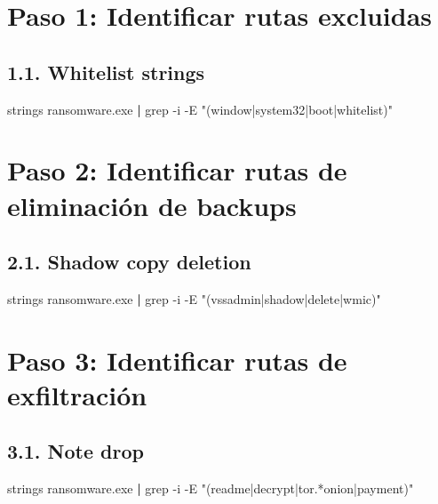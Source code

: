 \documentclass[
  letterpaper,
]{report}
\newenvironment{Shaded}{\begin{snugshade}}{\end{snugshade}}
\newcommand{\AttributeTok}[1]{\textcolor[rgb]{0.40,0.45,0.13}{#1}}
\newcommand{\FunctionTok}[1]{\textcolor[rgb]{0.28,0.35,0.67}{#1}}
\newcommand{\KeywordTok}[1]{\textcolor[rgb]{0.00,0.23,0.31}{\textbf{#1}}}
\newcommand{\NormalTok}[1]{\textcolor[rgb]{0.00,0.23,0.31}{#1}}
\newcommand{\StringTok}[1]{\textcolor[rgb]{0.13,0.47,0.30}{#1}}
\begin{document}
\section{Paso 1: Identificar rutas
excluidas}\label{paso-1-identificar-rutas-excluidas}

\subsection{1.1. Whitelist strings}\label{whitelist-strings}

\begin{Shaded}
\begin{Highlighting}[]
\FunctionTok{strings}\NormalTok{ ransomware.exe }\KeywordTok{|} \FunctionTok{grep} \AttributeTok{{-}i} \AttributeTok{{-}E} \StringTok{"(window|system32|boot|whitelist)"}
\end{Highlighting}
\end{Shaded}

\section{Paso 2: Identificar rutas de eliminación de
backups}\label{paso-2-identificar-rutas-de-eliminaciuxf3n-de-backups}

\subsection{2.1. Shadow copy deletion}\label{shadow-copy-deletion}

\begin{Shaded}
\begin{Highlighting}[]
\FunctionTok{strings}\NormalTok{ ransomware.exe }\KeywordTok{|} \FunctionTok{grep} \AttributeTok{{-}i} \AttributeTok{{-}E} \StringTok{"(vssadmin|shadow|delete|wmic)"}
\end{Highlighting}
\end{Shaded}

\section{Paso 3: Identificar rutas de
exfiltración}\label{paso-3-identificar-rutas-de-exfiltraciuxf3n-1}

\subsection{3.1. Note drop}\label{note-drop}

\begin{Shaded}
\begin{Highlighting}[]
\FunctionTok{strings}\NormalTok{ ransomware.exe }\KeywordTok{|} \FunctionTok{grep} \AttributeTok{{-}i} \AttributeTok{{-}E} \StringTok{"(readme|decrypt|tor.*onion|payment)"}
\end{Highlighting}
\end{Shaded}
\end{document}
